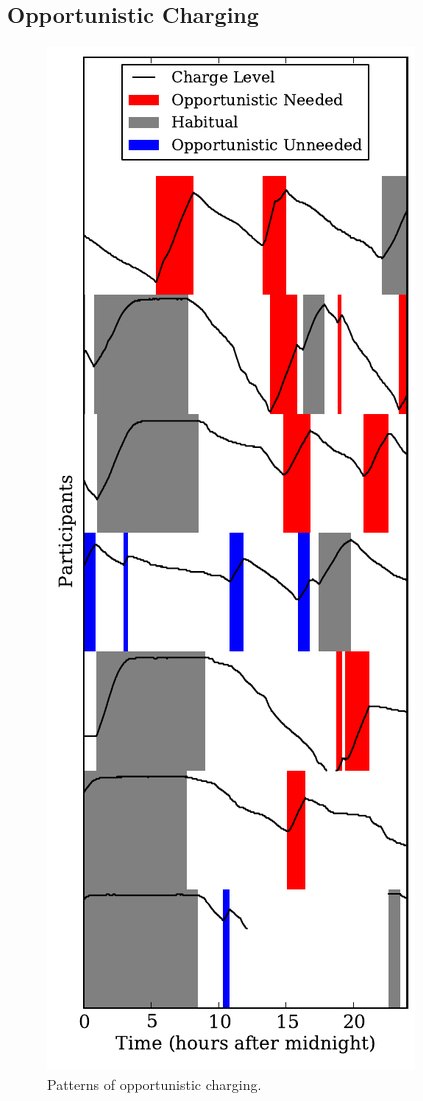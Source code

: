 \subsection{Opportunistic Charging}
\label{subsec-opportunistic}

\begin{figure}[t]
\includegraphics[width=\columnwidth]{./figures/power/opportunistic_charging/count_and_by_time/graph.pdf}
\caption{Patterns of opportunistic charging.}
\end{figure}

